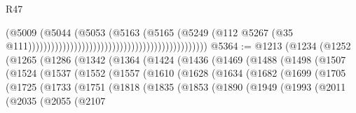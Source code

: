 \begin{lexlean}{R47}
\begin{coremodule}
                                                                                  (@5009
                                                                                    (@5044
                                                                                      (@5053
                                                                                        (@5163
                                                                                          (@5165
                                                                                            (@5249
                                                                                              (@112
                                                                                                @5267
                                                                                                (@35
                                                                                                  @111)))))))))))))))))))))))))))))))))))))))))))))))
@5364 := @1213
    (@1234
      (@1252
        (@1265
          (@1286
            (@1342
              (@1364
                (@1424
                  (@1436
                    (@1469
                      (@1488
                        (@1498
                          (@1507
                            (@1524
                              (@1537
                                (@1552
                                  (@1557
                                    (@1610
                                      (@1628
                                        (@1634
                                          (@1682
                                            (@1699
                                              (@1705
                                                (@1725
                                                  (@1733
                                                    (@1751
                                                      (@1818
                                                        (@1835
                                                          (@1853
                                                            (@1890
                                                              (@1949
                                                                (@1993
                                                                  (@2011
                                                                    (@2035
                                                                      (@2055
                                                                        (@2107

\end{coremodule}
\end{lexlean}
